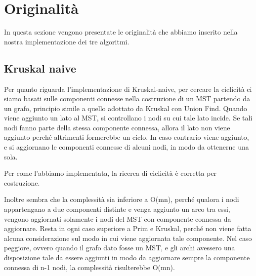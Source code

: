\chapter{Originalità\label{sec:originalita}}
\noindent In questa sezione vengono presentate le originalità che abbiamo inserito nella nostra implementazione dei tre algoritmi.

\section{Kruskal naive\label{sec:originalitanaives}}

Per quanto riguarda l'implementazione di Kruskal-naive, per cercare la ciclicità ci siamo basati sulle componenti connesse nella costruzione di un MST partendo da un grafo, principio simile a quello adottato da Kruskal con Union Find.
Quando viene aggiunto un lato al MST, si controllano i nodi su cui tale lato incide.
Se tali nodi fanno parte della stessa componente connessa, allora il lato non viene aggiunto perché altrimenti formerebbe un ciclo.
In caso contrario viene aggiunto, e si aggiornano le componenti connesse di alcuni nodi, in modo da ottenerne una sola.

Per come l'abbiamo implementata, la ricerca di ciclicità è corretta per costruzione.

Inoltre sembra che la complessità sia inferiore a O(mn), perché qualora i nodi appartengano a due componenti distinte e venga aggiunto un arco tra essi, vengono aggiornati solamente i nodi del MST con componente connessa da aggiornare.
Resta in ogni caso superiore a Prim e Kruskal, perché non viene fatta alcuna considerazione sul modo in cui viene aggiornata tale componente.
Nel caso peggiore, ovvero quando il grafo dato fosse un MST, e gli archi avessero una disposizione tale da essere aggiunti in modo da aggiornare sempre la componente connessa di n-1 nodi, la complessità risulterebbe O(mn).